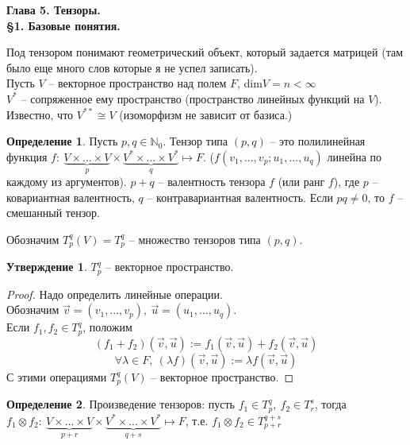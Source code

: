 \documentclass[a4paper, 12pt]{article}
\newcommand\tab[1][.5cm]{\hspace*{#1}}
\theoremstyle{definition}
\newtheorem*{definition}{Определение}
\newtheorem*{subtheorem}{Утверждение}
\begin{document}
    \begin{center}
        \begin{Large}
            \textbf{Глава 5. Тензоры.}\\
            \textbf{\S1. Базовые понятия.} 
        \end{Large}
    \end{center}
    Под тензором понимают геометрический объект, который задается матрицей (там было еще много слов которые я не успел записать). %
    \\
    Пусть $V$ -- векторное пространство над полем $F$, dim$V = n < \infty$\\
    $V^*$ -- сопряженное ему пространство (пространство линейных функций на $V$). Известно, что $V^{**} \cong V$ (изоморфизм не зависит от базиса.)
    \begin{definition}
        Пусть $p,q \in \mathbb{N}_0$. Тензор типа $(p,q)$ -- это полилинейная функция $f:\ \underbrace{V\times...\times V}_{p} \times \underbrace{V^*\times...\times V^*}_{q} \longmapsto F$. ($f(v_1,...,v_p;u_1,...,u_q)$ линейна по каждому из аргументов). $p+q$ -- валентность тензора $f$ (или ранг $f$), где $p$ -- ковариантная валентность, $q$ -- контравариантная валентность. Если $pq \neq 0$, то $f$ -- смешанный тензор.      
    \end{definition} 
    \tab[-0.7cm]Обозначим $T_p^q(V) = T_p^q$ -- множество тензоров типа $(p,q)$.
    \begin{subtheorem}
        $T_p^q$ -- векторное пространство. 
    \end{subtheorem} 
    \begin{proof}
        Надо определить линейные операции.\\ Обозначим $\vec v = (v_1,...,v_p),\ \vec u = (u_1,...,u_q).$\\
        Если $f_1,f_2 \in T_p^q$, положим
        $$(f_1 + f_2)(\vec v, \vec u) := f_1(\vec v, \vec u) + f_2(\vec v, \vec u)$$
        $$\forall \lambda \in F,\ (\lambda f)(\vec v, \vec u) := \lambda f(\vec v, \vec u)$$  
        С этими операциями $T_p^q(V)$ -- векторное пространство. 

    \end{proof}
    \begin{definition}
        Произведение тензоров: пусть $f_1 \in T_p^q,\ f_2 \in T_r^s$, тогда $f_1 \otimes f_2:\ \underbrace{V\times...\times V}_{p+r}\times \underbrace{V^*\times...\times V^*}_{q + s} \longmapsto F$, т.е. $f_1 \otimes f_2 \in T_{p+r}^{q+s}$
    \end{definition}
\end{document}
